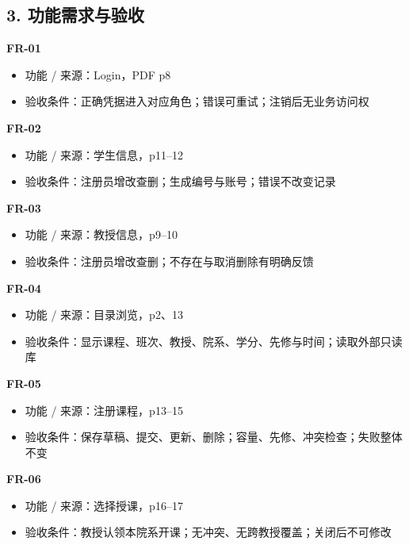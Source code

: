 \documentclass[UTF8,11pt,a4paper]{ctexart}
\providecommand{\tightlist}{\setlength{\itemsep}{0pt}\setlength{\parskip}{0pt}}
\begin{document}
\hypertarget{3-ux529fux80fdux9700ux6c42ux4e0eux9a8cux6536}{%
\subsection{3.
功能需求与验收}\label{3-ux529fux80fdux9700ux6c42ux4e0eux9a8cux6536}}

\textbf{FR-01}

\begin{itemize}
\tightlist
\item
  功能 / 来源：Login，PDF p8
\item
  验收条件：正确凭据进入对应角色；错误可重试；注销后无业务访问权
\end{itemize}

\textbf{FR-02}

\begin{itemize}
\tightlist
\item
  功能 / 来源：学生信息，p11--12
\item
  验收条件：注册员增改查删；生成编号与账号；错误不改变记录
\end{itemize}

\textbf{FR-03}

\begin{itemize}
\tightlist
\item
  功能 / 来源：教授信息，p9--10
\item
  验收条件：注册员增改查删；不存在与取消删除有明确反馈
\end{itemize}

\textbf{FR-04}

\begin{itemize}
\tightlist
\item
  功能 / 来源：目录浏览，p2、13
\item
  验收条件：显示课程、班次、教授、院系、学分、先修与时间；读取外部只读库
\end{itemize}

\textbf{FR-05}

\begin{itemize}
\tightlist
\item
  功能 / 来源：注册课程，p13--15
\item
  验收条件：保存草稿、提交、更新、删除；容量、先修、冲突检查；失败整体不变
\end{itemize}

\textbf{FR-06}

\begin{itemize}
\tightlist
\item
  功能 / 来源：选择授课，p16--17
\item
  验收条件：教授认领本院系开课；无冲突、无跨教授覆盖；关闭后不可修改
\end{itemize}
\end{document}
